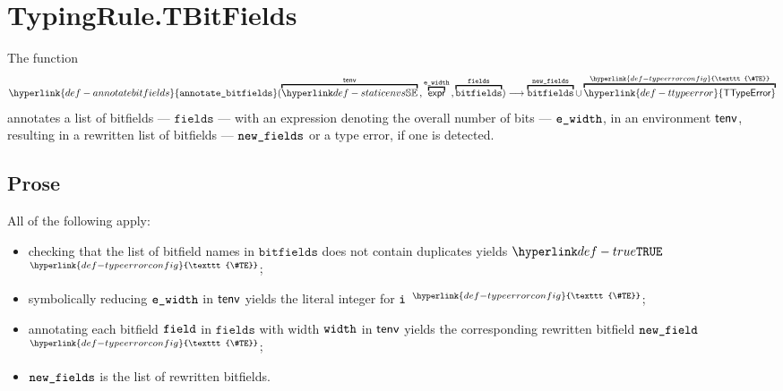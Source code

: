 \documentclass{book}
\newcommand\TTypeError[0]{\hyperlink{def-ttypeerror}{\textsf{TTypeError}}}
\newcommand\TypeErrorConfig[0]{\hyperlink{def-typeerrorconfig}{\texttt{\#TE}}}
\newcommand\ProseOrTypeError[0]{\hyperlink{def-proseortypeerror}{$^{\TypeErrorConfig}$}}
\newcommand\annotatebitfields[0]{\hyperlink{def-annotatebitfields}{\texttt{annotate\_bitfields}}}
\newcommand\bitfields[0]{\texttt{bitfields}}
\newcommand\fields[0]{\texttt{fields}}
\begin{document}

\section{TypingRule.TBitFields \label{sec:TypingRule.TBitFields}}
\hypertarget{def-annotatebitfields}{}
The function
\[
  \annotatebitfields(\overname{\staticenvs}{\tenv} \aslsep \overname{\expr}{\ewidth} \aslsep \overname{\bitfields}{\fields})
  \aslto \overname{\bitfields}{\newfields} \cup \overname{\TTypeError}{\TypeErrorConfig}
\]
annotates a list of bitfields --- $\fields$ --- with an expression denoting the overall number of bits --- $\texttt{e\_width}$,
in an environment $\textsf{tenv}$, resulting in a
rewritten list of bitfields --- $\texttt{new\_fields}$ or a type error, if one is detected.

\subsection{Prose}
All of the following apply:
\begin{itemize}
  \item checking that the list of bitfield names in $\bitfields$ does not contain duplicates yields $\True$ \ProseOrTypeError;
  \item symbolically reducing $\texttt{e\_width}$ in $\textsf{tenv}$ yields the literal integer for $\texttt{i}$ \ProseOrTypeError;
  \item annotating each bitfield $\texttt{field}$ in $\fields$ with width $\texttt{width}$ in $\textsf{tenv}$ yields the corresponding rewritten
  bitfield $\texttt{new\_field}$ \ProseOrTypeError;
  \item $\texttt{new\_fields}$ is the list of rewritten bitfields.
\end{itemize}


\end{document}
